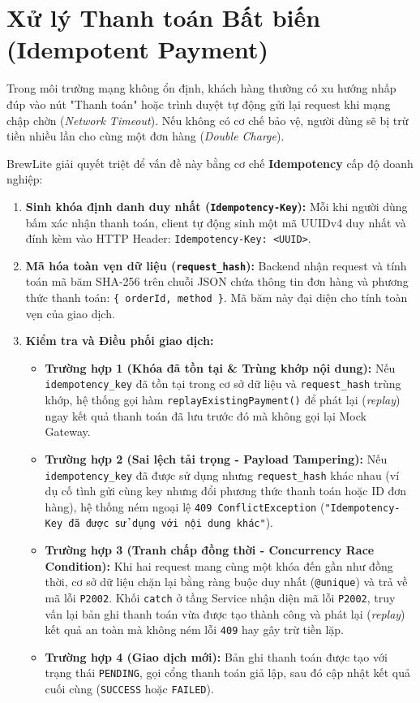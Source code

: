 \section{Xử lý Thanh toán Bất biến (Idempotent Payment)}
Trong môi trường mạng không ổn định, khách hàng thường có xu hướng nhấp đúp vào nút "Thanh toán" hoặc trình duyệt tự động gửi lại request khi mạng chập chờn (\textit{Network Timeout}). Nếu không có cơ chế bảo vệ, người dùng sẽ bị trừ tiền nhiều lần cho cùng một đơn hàng (\textit{Double Charge}).

BrewLite giải quyết triệt để vấn đề này bằng cơ chế \textbf{Idempotency} cấp độ doanh nghiệp:
\begin{enumerate}
    \item \textbf{Sinh khóa định danh duy nhất (\texttt{Idempotency-Key}):} Mỗi khi người dùng bấm xác nhận thanh toán, client tự động sinh một mã UUIDv4 duy nhất và đính kèm vào HTTP Header: \texttt{Idempotency-Key: <UUID>}.
    \item \textbf{Mã hóa toàn vẹn dữ liệu (\texttt{request\_hash}):} Backend nhận request và tính toán mã băm SHA-256 trên chuỗi JSON chứa thông tin đơn hàng và phương thức thanh toán: \texttt{\{ orderId, method \}}. Mã băm này đại diện cho tính toàn vẹn của giao dịch.
    \item \textbf{Kiểm tra và Điều phối giao dịch:}
    \begin{itemize}
        \item \textbf{Trường hợp 1 (Khóa đã tồn tại \& Trùng khớp nội dung):} Nếu \texttt{idempotency\_key} đã tồn tại trong cơ sở dữ liệu và \texttt{request\_hash} trùng khớp, hệ thống gọi hàm \texttt{replayExistingPayment()} để phát lại (\textit{replay}) ngay kết quả thanh toán đã lưu trước đó mà không gọi lại Mock Gateway.
        \item \textbf{Trường hợp 2 (Sai lệch tải trọng - Payload Tampering):} Nếu \texttt{idempotency\_key} đã được sử dụng nhưng \texttt{request\_hash} khác nhau (ví dụ cố tình gửi cùng key nhưng đổi phương thức thanh toán hoặc ID đơn hàng), hệ thống ném ngoại lệ \texttt{409 ConflictException} (\texttt{"Idempotency-Key đã được sử dụng với nội dung khác"}).
        \item \textbf{Trường hợp 3 (Tranh chấp đồng thời - Concurrency Race Condition):} Khi hai request mang cùng một khóa đến gần như đồng thời, cơ sở dữ liệu chặn lại bằng ràng buộc duy nhất (\texttt{@unique}) và trả về mã lỗi \texttt{P2002}. Khối \texttt{catch} ở tầng Service nhận diện mã lỗi \texttt{P2002}, truy vấn lại bản ghi thanh toán vừa được tạo thành công và phát lại (\textit{replay}) kết quả an toàn mà không ném lỗi \texttt{409} hay gây trừ tiền lặp.
        \item \textbf{Trường hợp 4 (Giao dịch mới):} Bản ghi thanh toán được tạo với trạng thái \texttt{PENDING}, gọi cổng thanh toán giả lập, sau đó cập nhật kết quả cuối cùng (\texttt{SUCCESS} hoặc \texttt{FAILED}).
    \end{itemize}
\end{enumerate}

